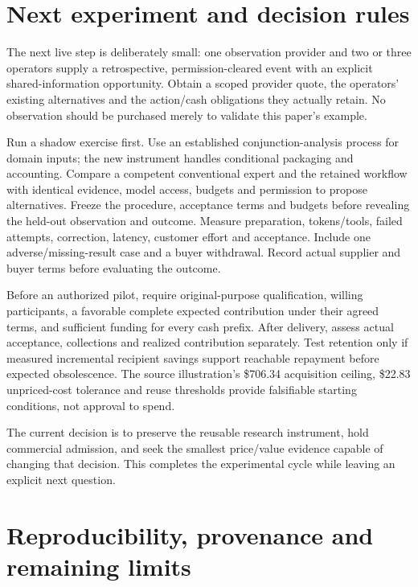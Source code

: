 \documentclass[11pt,letterpaper]{article}
\begin{document}
\hypertarget{next-experiment-and-decision-rules}{%
\section{Next experiment and decision
rules}\label{next-experiment-and-decision-rules}}

The next live step is deliberately small: one observation provider and
two or three operators supply a retrospective, permission-cleared event
with an explicit shared-information opportunity. Obtain a scoped
provider quote, the operators' existing alternatives and the action/cash
obligations they actually retain. No observation should be purchased
merely to validate this paper's example.

Run a shadow exercise first. Use an established conjunction-analysis
process for domain inputs; the new instrument handles conditional
packaging and accounting. Compare a competent conventional expert and
the retained workflow with identical evidence, model access, budgets and
permission to propose alternatives. Freeze the procedure, acceptance
terms and budgets before revealing the held-out observation and outcome.
Measure preparation, tokens/tools, failed attempts, correction, latency,
customer effort and acceptance. Include one adverse/missing-result case
and a buyer withdrawal. Record actual supplier and buyer terms before
evaluating the outcome.

Before an authorized pilot, require original-purpose qualification,
willing participants, a favorable complete expected contribution under
their agreed terms, and sufficient funding for every cash prefix. After
delivery, assess actual acceptance, collections and realized
contribution separately. Test retention only if measured incremental
recipient savings support reachable repayment before expected
obsolescence. The source illustration's \$706.34 acquisition ceiling,
\$22.83 unpriced-cost tolerance and reuse thresholds provide falsifiable
starting conditions, not approval to spend.

The current decision is to preserve the reusable research instrument,
hold commercial admission, and seek the smallest price/value evidence
capable of changing that decision. This completes the experimental cycle
while leaving an explicit next question.

\hypertarget{reproducibility-provenance-and-remaining-limits}{%
\section{Reproducibility, provenance and remaining
limits}\label{reproducibility-provenance-and-remaining-limits}}
\end{document}
